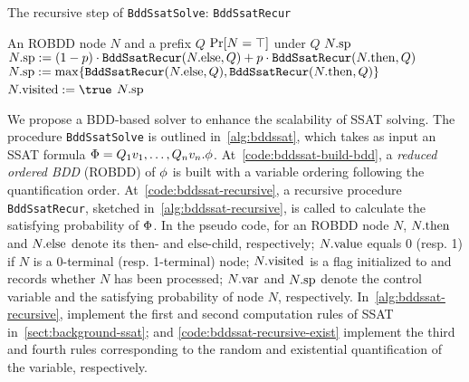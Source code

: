 \begin{algorithm}[t]
    \caption{The recursive step of \texttt{BddSsatSolve}: \texttt{BddSsatRecur}}
    \label{alg:bddssat-recursive}
    \begin{algorithmic}[1]
        \REQUIRE An ROBDD node $N$ and a prefix $Q$
        \ENSURE $\Pr[N=\top]$ under $Q$
        \label{code:bddssat-recursive-constant-start}
        \RETURN $N.\mathrm{sp}$\label{code:bddssat-recursive-constant-end}
        \ENDIF
        \STATE $N.\mathrm{sp}:=(1-p)\cdot\texttt{BddSsatRecur}(N.\mathrm{else},Q)+p\cdot\texttt{BddSsatRecur}(N.\mathrm{then},Q)$
        \label{code:bddssat-recursive-random}
        \ELSE
        \STATE $N.\mathrm{sp}:=\max\{\texttt{BddSsatRecur}(N.\mathrm{else},Q),\texttt{BddSsatRecur}(N.\mathrm{then},Q)\}$
        \label{code:bddssat-recursive-exist}
        \ENDIF
        \STATE $\nodevisit{N} := \true$
        \ENDIF
        \RETURN $N.\mathrm{sp}$
    \end{algorithmic}
\end{algorithm}

We propose a BDD-based solver to enhance the scalability of SSAT solving.
The procedure \texttt{BddSsatSolve} is outlined in~\cref{alg:bddssat},
which takes as input an SSAT formula $\Phi=Q_1 v_1,\ldots,Q_n v_n.\phi$.
At~\cref{code:bddssat-build-bdd},
a \textit{reduced ordered BDD} (ROBDD) of $\phi$ is built with a variable ordering following the quantification order.
At~\cref{code:bddssat-recursive},
a recursive procedure \texttt{BddSsatRecur},
sketched in~\cref{alg:bddssat-recursive},
is called to calculate the satisfying probability of $\Phi$.
In the pseudo code, for an ROBDD node $N$,
$N.\mathrm{then}$ and $N.\mathrm{else}$ denote its $\mathrm{then}$- and $\mathrm{else}$-child, respectively;
$N.\mathrm{value}$ equals 0 (resp. 1) if $N$ is a 0-terminal (resp. 1-terminal) node;
$N.\mathrm{visited}$ is a flag initialized to \false and records whether $N$ has been processed;
$N.\mathrm{var}$ and $N.\mathrm{sp}$ denote the control variable and the satisfying probability of node $N$, respectively.
In~\cref{alg:bddssat-recursive},
 implement the first and second computation rules of SSAT in~\cref{sect:background-ssat};
 and \cref{code:bddssat-recursive-exist} implement the third and fourth rules corresponding to the random and existential quantification of the variable, respectively.

